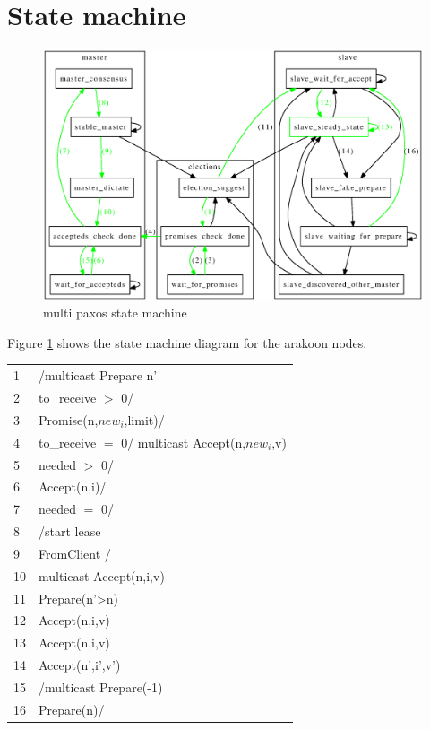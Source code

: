 \section{State machine}

\begin{figure}[ht]\label{fig:paxos}
  \includegraphics[width=\textwidth]{doc/states.eps}
  \caption{multi paxos state machine}
\end{figure}
Figure \ref{fig:paxos} shows the state machine diagram for the arakoon nodes. 
\begin{table}
\begin{tabular}{ll}
1  & /multicast Prepare n' \\
2  & to\_receive $>$ 0/ \\
3  & Promise(n,$new_i$,limit)/ \\
4  & to\_receive $=$ 0/ multicast Accept(n,$new_i$,v)\\
5  & needed $>$ 0/\\
6  & Accept(n,i)/\\
7  & needed $=$ 0/\\
8  & /start lease\\
9  & FromClient / \\
10 & multicast Accept(n,i,v) \\
11 & Prepare(n'>n)\\
12 & Accept(n,i,v)\\
13 & Accept(n,i,v)\\
14 & Accept(n',i',v')\\
15 & /multicast Prepare(-1)\\
16 & Prepare(n)/\\
\end{tabular}
\end{table}
